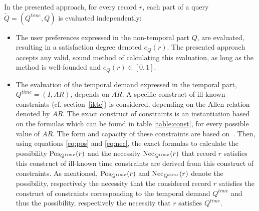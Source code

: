 In the presented approach, for every record $r$, each part of a query $\tilde{Q} = \left( Q^{time}, Q \right)$ is evaluated independently:
\begin{itemize}
\item
The user preferences expressed in the non-temporal part $Q$, are evaluated, resulting in a satisfaction degree denoted $e_Q(r)$. The presented approach accepts any valid, sound method of calculating this evaluation, as long as the method is well-founded and $e_Q(r) \in \left[0,1\right]$.
\item
The evaluation of the temporal demand expressed in the temporal part, $Q^{time} = \left( I,AR \right)$, depends on $AR$. A specific construct of ill-known constraints (cf. section~\ref{iktc}) is considered, depending on the Allen relation denoted by $AR$. The exact construct of constraints is an instantiation based on the formulas which can be found in table \ref{table:const}, for every possible value of $AR$. The form and capacity of these constraints are based on~\cite{Pon11}. Then, using equations \eqref{eq:pos} and \eqref{eq:nec}, the exact formulas to calculate the possibility $\operatorname{Pos}_{Q^{time}}(r)$ and the necessity $\operatorname{Nec}_{Q^{time}}(r)$ that record $r$ satisfies this construct of ill-known time constraints are derived from this construct of constraints. As mentioned, $\operatorname{Pos}_{Q^{time}}(r)$ and $\operatorname{Nec}_{Q^{time}}(r)$ denote the possibility, respectively the necessity that the considered record $r$ satisfies the construct of constraints corresponding to the temporal demand $Q^{time}$ and thus the possibility, respectively the necessity that $r$ satisfies $Q^{time}$.


\end{itemize}


